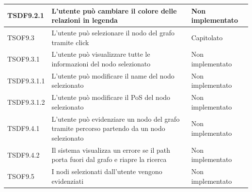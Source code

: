 \documentclass[openany,12pt,a4paper]{report}
\begin{document}
\begin{longtable}{| p{2cm} |p{5cm} | p{2.5cm} |}
	\newline TSDF9.2.1&
	\newline L'utente può cambiare il colore delle relazioni in legenda&
	\newline  Non implementato
	\\[1em]
	\hline
	
	\newline TSOF9.3&
	\newline L'utente può selezionare il nodo del grafo tramite click&
	\newline {}{UC13.1} \newline Capitolato
	\\[1em]
	\hline
	
	\newline TSOF9.3.1&
	\newline L'utente può visualizzare tutte le informazioni del nodo selezionato&
	\newline Non implementato
	\\[1em]
	\hline
	
	\newline TSDF9.3.1.1&
	\newline L'utente può modificare il name del nodo selezionato&
	\newline Non implementato
	\\[1em]
	\hline
	
	\newline TSDF9.3.1.2&
	\newline L'utente può modificare il PoS del nodo selezionato&
	\newline Non implementato
	\\[1em]
	\hline
	
	\newline TSDF9.4.1&
	\newline L'utente può evidenziare un nodo del grafo tramite percorso partendo da un nodo selezionato&
	\newline Non implementato
	\\[1em]
	\hline
	
	\newline TSDF9.4.2&
	\newline Il sistema visualizza un errore se il path porta fuori dal grafo e riapre la ricerca&
	\newline Non implementato
	\\[1em]
	\hline
	
	\newline TSOF9.5&
	\newline I nodi selezionati dall'utente vengono evidenziati&
	\newline Non implementato
	\\[1em]
	\hline
	

\end{longtable}
\end{document}
